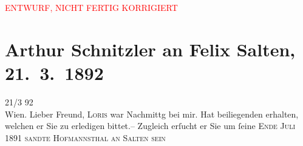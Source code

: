 
\begin{center}
            \textcolor{red}{ENTWURF, NICHT FERTIG KORRIGIERT}
                      \end{center}
            
         
         \renewcommand{\erwaehntePersonen}{Personen: Max Henze, Hugo von Hofmannsthal, Felix Salten}
         \renewcommand{\erwaehnteInstitutionen}{Institutionen: Allgemeine Theater-Revue für Bühne und Welt. Illustrierte Halbmonatsschrift}
         \renewcommand{\erwaehnteOrte}{Orte: Berlin, Café Central, Wien}
         \renewcommand{\erwaehnteWerke}{Werke: Der Tod des Tizian, Die Bilanz der Ehe. Novellistische Studien}
               \section[Arthur Schnitzler an Felix Salten, 21. 3. 1892]{ Arthur Schnitzler an Felix Salten, 21. 3. 1892}\nopagebreak{}\rehead{ }\begin{ledgroupsized}[t]{13cm}\normalsize\beginnumbering \toendnotes[C]{\smallbreak\pagebreak[2]} 
\toendnotes[C]{\smallbreak}\pstart
           \raggedleft{}{\pb}21/3 92{\\}Wien. \pend
           \pstart{}Lieber Freund,\pend\pstart
           \textsc{Loris} war Nachmittg bei mir. Hat beiliegenden \label{K_L02955-1v}\label{K_L02955-1h} erhalten, welchen er Sie zu erledigen bittet.– Zugleich
               erſucht er Sie um ſeine \textsc{\label{K_L02955-11v}\label{K_L02955-11h}Ende Juli 1891 sandte Hofmannsthal an Salten sein
}
\end{ledgroupsized}
